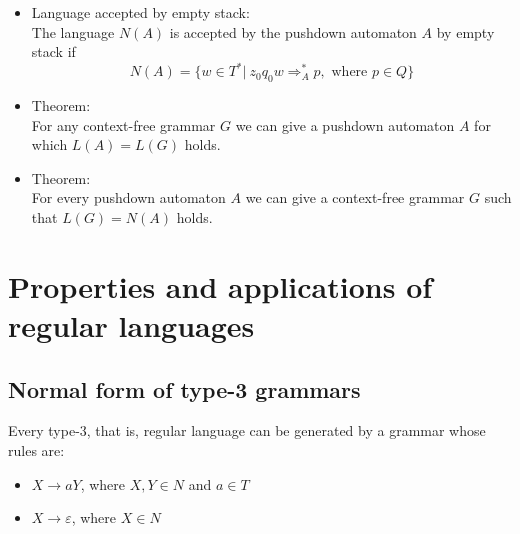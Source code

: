 \documentclass[margin=0px]{article}
\begin{document}
\begin{description}
\begin{itemize}
\begin{enumerate}
                            or
                      \item $|(z, q, \varepsilon)| = 1 $ and $\forall a \in T: \delta(z, q, a) = \emptyset$
                  \end{enumerate}
            \item Language accepted by empty stack: \\
                  The language $N(A)$ is accepted by the pushdown automaton $A$ by empty stack if
                  \[ N(A) = \{w \in T^* | \ z_0q_0w \Longrightarrow_A^* p, \textrm{ where } p \in Q \} \]
            \item Theorem: \\
                  For any context-free grammar $G$ we can give a pushdown automaton $A$ for which $L(A) = L(G)$ holds.
            \item Theorem: \\
                  For every pushdown automaton $A$ we can give a context-free grammar $G$ such that $L(G) = N(A)$ holds.
        \end{itemize}
\end{description}
\section{Properties and applications of regular languages}
\subsection{Normal form of type-3 grammars}
Every type-3, that is, regular language can be generated by a grammar whose rules are:
\begin{itemize}
    \item $ X \rightarrow aY$, where $X,Y \in N$ and $a \in T$
    \item $X \rightarrow \varepsilon$, where $X \in N$
\end{itemize}
\end{document}
